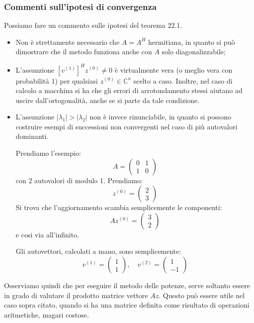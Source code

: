 \documentclass[a4paper,11pt]{article}
\begin{document}
\subsubsection{Commenti sull'ipotesi di convergenza}
Possiamo fare un commento sulle ipotesi del teorema 22.1.
\begin{itemize}
	\item Non è strettamente necessario che $A = A^H$ hermitiana, in quanto si può dimostrare che il metodo funziona anche con $A$ solo diagonalizzabile;
	\item L'assunzione $\left[ v^{(1)} \right]^H z^{(0)} \neq 0$ è virtualmente vera (o meglio vera con probabilità $1$) per qualsiasi $z^{(0)} \in \mathbb{C}^n$ scelto a caso.
		Inoltre, nel caso di calcolo a macchina si ha che gli errori di arrotondamento stessi aiutano ad uscire dall'ortogonalità, anche se si parte da tale condizione.
		\item L'assunzione $|\lambda_1| > |\lambda_2|$ non è invece rinunciabile, in quanto si possono costruire esempi di successioni non convergenti nel caso di più autovalori dominanti.

			Prendiamo l'esempio:
			$$
				A =
				\begin{pmatrix}
					0 & 1 \\ 
					1 & 0
				\end{pmatrix}
			$$
			con 2 autovalori di modulo 1.
			Prendiamo:
			$$
			z^{(0)} = 
			\begin{pmatrix}
				2 \\ 3
			\end{pmatrix}
			$$
			Si trova che l'aggiornamento scambia semplicemente le componenti:
			$$
			A z^{(0)} =
			\begin{pmatrix}
				3 \\ 2
			\end{pmatrix}
			$$
			e cosi via all'infinito.

			Gli autovettori, calcolati a mano, sono semplicemente:
			$$
				v^{(1)} =
				\begin{pmatrix}
					1 \\ 1
				\end{pmatrix}, \quad
				v^{(2)} =
				\begin{pmatrix}
					1 \\ -1
				\end{pmatrix}
			$$
\end{itemize}

Osserviamo quindi che per eseguire il metodo delle potenze, serve soltanto essere in grado di valutare il prodotto matrice vettore $A z$.
Questo può essere utile nel caso sopra citato, quando si ha una matrice definita come risultato di operazioni aritmetiche, magari costose.
\end{document}
